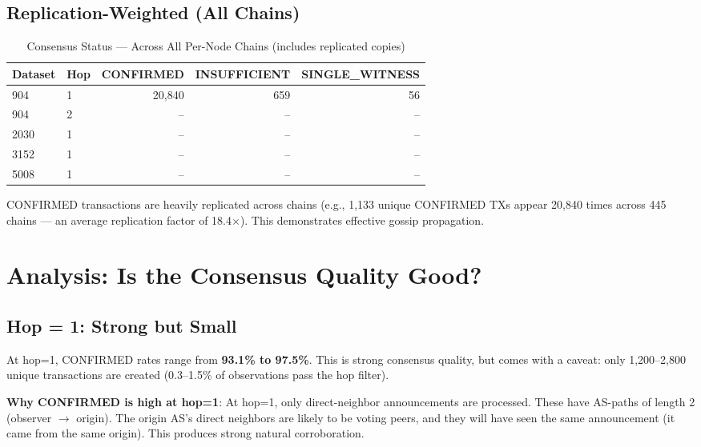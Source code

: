 \documentclass[11pt,a4paper]{article}
\begin{document}
\subsection{Replication-Weighted (All Chains)}

\begin{table}[H]
\centering
\caption{Consensus Status --- Across All Per-Node Chains (includes replicated copies)}
\begin{tabular}{llrrr}
\toprule
\textbf{Dataset} & \textbf{Hop} & \textbf{CONFIRMED} & \textbf{INSUFFICIENT} & \textbf{SINGLE\_WITNESS} \\
\midrule
904   & 1 & 20,840 & 659   & 56 \\
904   & 2 & --     & --    & -- \\
2030  & 1 & --     & --    & -- \\
3152  & 1 & --     & --    & -- \\
5008  & 1 & --     & --    & -- \\
\bottomrule
\end{tabular}
\end{table}

CONFIRMED transactions are heavily replicated across chains (e.g., 1,133 unique
CONFIRMED TXs appear 20,840 times across 445 chains --- an average replication
factor of 18.4$\times$). This demonstrates effective gossip propagation.

\section{Analysis: Is the Consensus Quality Good?}

\subsection{Hop = 1: Strong but Small}

At hop=1, CONFIRMED rates range from \textbf{93.1\% to 97.5\%}. This is strong
consensus quality, but comes with a caveat: only 1,200--2,800 unique transactions
are created (0.3--1.5\% of observations pass the hop filter).

\textbf{Why CONFIRMED is high at hop=1}: At hop=1, only direct-neighbor
announcements are processed. These have AS-paths of length 2 (observer $\to$ origin).
The origin AS's direct neighbors are likely to be voting peers, and they will
have seen the same announcement (it came from the same origin). This produces
strong natural corroboration.
\end{document}
